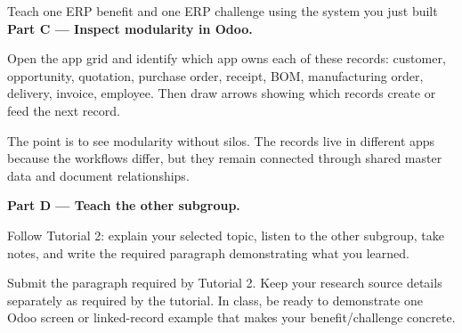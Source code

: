 \begin{labproject}{Teach one ERP benefit and one ERP challenge using the system you just built}
\medskip\noindent\textbf{Part C --- Inspect modularity in Odoo.}

Open the app grid and identify which app owns each of these records: customer, opportunity, quotation, purchase order, receipt, BOM, manufacturing order, delivery, invoice, employee. Then draw arrows showing which records create or feed the next record.

\begin{keyidea}
The point is to see modularity without silos. The records live in different apps because the workflows differ, but they remain connected through shared master data and document relationships.
\end{keyidea}

\medskip\noindent\textbf{Part D --- Teach the other subgroup.}

Follow Tutorial 2: explain your selected topic, listen to the other subgroup, take notes, and write the required paragraph demonstrating what you learned.
\end{labproject}

\begin{labdeliverable}
Submit the paragraph required by Tutorial 2. Keep your research source details separately as required by the tutorial. In class, be ready to demonstrate one Odoo screen or linked-record example that makes your benefit/challenge concrete.
\end{labdeliverable}
